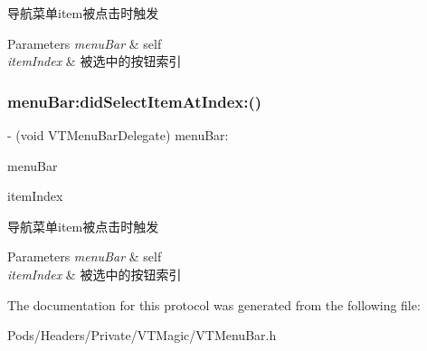 导航菜单item被点击时触发


\begin{DoxyParams}{Parameters}
{\em menu\+Bar} & self \\
\hline
{\em item\+Index} & 被选中的按钮索引 \\
\hline
\end{DoxyParams}
\mbox{\label{protocol_v_t_menu_bar_delegate_01-p_a3dc0536177243602e74fe509e67563e5}} 
\subsubsection{\texorpdfstring{menu\+Bar\+:did\+Select\+Item\+At\+Index\+:()}{menuBar:didSelectItemAtIndex:()}\hspace{0.1cm}{\footnotesize\ttfamily [3/3]}}
{\footnotesize\ttfamily -\/ (void V\+T\+Menu\+Bar\+Delegate) menu\+Bar\+: \begin{DoxyParamCaption}\item[{(\mbox{\hyperlink{interface_v_t_menu_bar}{V\+T\+Menu\+Bar}} $\ast$)}]{menu\+Bar }\item[{didSelectItemAtIndex:(N\+S\+U\+Integer)}]{item\+Index }\end{DoxyParamCaption}\hspace{0.3cm}{\ttfamily [optional]}}

导航菜单item被点击时触发


\begin{DoxyParams}{Parameters}
{\em menu\+Bar} & self \\
\hline
{\em item\+Index} & 被选中的按钮索引 \\
\hline
\end{DoxyParams}


The documentation for this protocol was generated from the following file\+:\begin{DoxyCompactItemize}
\item 
Pods/\+Headers/\+Private/\+V\+T\+Magic/V\+T\+Menu\+Bar.\+h\end{DoxyCompactItemize}
